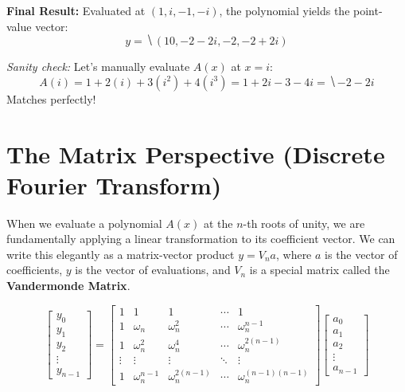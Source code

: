 \documentclass[11  pt]{article}
\begin{document}
\textbf{Final Result:} Evaluated at $(1, i, -1, -i)$, the polynomial yields the point-value vector:
\begin{equation*}
    y = \hide{(10, -2-2i, -2, -2+2i)}
\end{equation*}

\vs{0.5cm}
\textit{Sanity check:} Let's manually evaluate $A(x)$ at $x=i$: 
\begin{equation*}
A(i) = 1 + 2(i) + 3(i^2) + 4(i^3) = 1 + 2i - 3 - 4i = \hide{-2 - 2i}
\end{equation*}
Matches perfectly!

\newpage

\section{The Matrix Perspective (Discrete Fourier Transform)}

When we evaluate a polynomial $A(x)$ at the $n$-th roots of unity, we are fundamentally applying a linear transformation to its coefficient vector. We can write this elegantly as a matrix-vector product $y = V_n a$, where $a$ is the vector of coefficients, $y$ is the vector of evaluations, and $V_n$ is a special matrix called the \textbf{Vandermonde Matrix}.

\begin{equation*}
    \begin{bmatrix}
        y_0 \\ y_1 \\ y_2 \\ \vdots \\ y_{n-1}
    \end{bmatrix}
    =
    \begin{bmatrix}
        1 & 1 & 1 & \cdots & 1 \\
        1 & \omega_n & \omega_n^2 & \cdots & \omega_n^{n-1} \\
        1 & \omega_n^2 & \omega_n^4 & \cdots & \omega_n^{2(n-1)} \\
        \vdots & \vdots & \vdots & \ddots & \vdots \\
        1 & \omega_n^{n-1} & \omega_n^{2(n-1)} & \cdots & \omega_n^{(n-1)(n-1)}
    \end{bmatrix}
    \begin{bmatrix}
        a_0 \\ a_1 \\ a_2 \\ \vdots \\ a_{n-1}
    \end{bmatrix}
\end{equation*}
\end{document}
